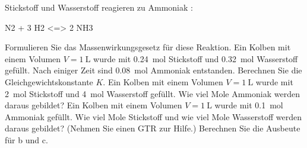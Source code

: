 \documentclass[DIV11]{scrartcl}
\begin{document}
\begin{question}[name=Ammoniaksynthese]
Stickstoff  und Wasserstoff  reagieren zu Ammoniak :
\begin{reaction*}
 N2 + 3 H2 <=> 2 NH3
\end{reaction*}
\begin{tasks}
  \task Formulieren Sie das Massenwirkungsgesetz für diese Reaktion.
  \task Ein Kolben mit einem Volumen $V = \SI{1}{\liter}$ wurde mit
    \SI{0.24}{\mole} Stickstoff und \SI{0.32}{\mole} Wasserstoff gefüllt.
    Nach einiger Zeit sind \SI{0.08}{\mole} Ammoniak entstanden.  Berechnen
    Sie die Gleichgewichtskonstante $K$.
  \task Ein Kolben mit einem Volumen $V = \SI{1}{\liter}$ wurde mit
    \SI{2}{\mole} Stickstoff und \SI{4}{\mole} Wasserstoff gefüllt.  Wie viel
    Mole Ammoniak werden daraus gebildet?
  \task Ein Kolben mit einem Volumen $V = \SI{1}{\liter}$ wurde mit
    \SI{0.1}{\mole} Ammoniak gefüllt.  Wie viel Mole Stickstoff und wie viel
    Mole Wasserstoff werden daraus gebildet?  (Nehmen Sie einen GTR zur
    Hilfe.)
  \task Berechnen Sie die Ausbeute für b und c.
\end{tasks}
\end{question}
\end{document}
